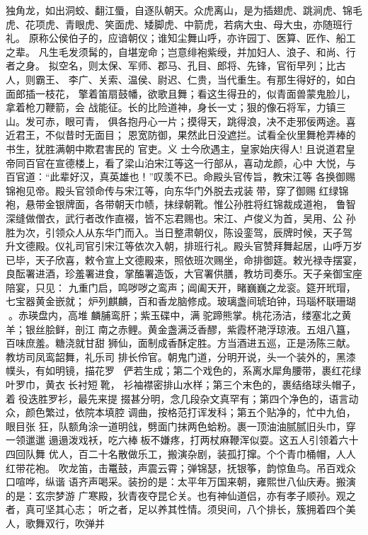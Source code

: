 独角龙，如出洞蛟、翻江蜃，自逐队朝天。众虎离山，是为插翅虎、跳涧虎、锦毛
虎、花项虎、青眼虎、笑面虎、矮脚虎、中箭虎，若病大虫、母大虫，亦随班行礼。
原称公侯伯子的，应谙朝仪；谁知尘舞山呼，亦许园丁、医算、匠作、船工之辈。
凡生毛发须髯的，自堪宠命；岂意绯袍紫绶，并加妇人、浪子、和尚、行者之身。
拟空名，则太保、军师、郡马、孔目、郎将、先锋，官衔早列；比古人，则霸王、
李广、关索、温侯、尉迟、仁贵，当代重生。有那生得好的，如白面郎插一枝花，
擎着笛扇鼓幡，欲歌且舞；看这生得丑的，似青面兽蒙鬼脸儿，拿着枪刀鞭箭，会
战能征。长的比险道神，身长一丈；狠的像石将军，力镇三山。发可赤，眼可青，
俱各抱丹心一片；摸得天，跳得浪，决不走邪佞两途。喜近君王，不似昔时无面目；
恩宽防御，果然此日没遮拦。试看全伙里舞枪弄棒的书生，犹胜满朝中欺君害民的
官吏。义
士今欣遇主，皇家始庆得人!
且说道君皇帝同百官在宣德楼上，看了梁山泊宋江等这一行部从，喜动龙颜，心中
大悦，与百官道：“此辈好汉，真英雄也！”叹羡不已。命殿头官传旨，教宋江等
各换御赐锦袍见帝。殿头官领命传与宋江等，向东华门外脱去戎装带，穿了御赐
红绿锦袍，悬带金银牌面，各带朝天巾帻，抹绿朝靴。惟公孙胜将红锦裁成道袍，
鲁智深缝做僧衣，武行者改作直裰，皆不忘君赐也。宋江、卢俊义为首，吴用、公
孙胜为次，引领众人从东华门而入。当日整肃朝仪，陈设銮驾，辰牌时候，天子驾
升文德殿。仪礼司官引宋江等依次入朝，排班行礼。殿头官赞拜舞起居，山呼万岁
已毕，天子欣喜，敕令宣上文德殿来，照依班次赐坐，命排御筵。敕光禄寺摆宴，
良酝署进酒，珍羞署进食，掌醢署造饭，大官署供膳，教坊司奏乐。天子亲御宝座
陪宴，只见：
九重门启，鸣哕哕之鸾声；阊阖天开，睹巍巍之龙衮。筵开玳瑁，七宝器黄金嵌就；
炉列麒麟，百和香龙脑修成。玻璃盏间琥珀钟，玛瑙杯联珊瑚。赤瑛盘内，高堆
麟脯鸾肝；紫玉碟中，满驼蹄熊掌。桃花汤洁，缕塞北之黄羊；银丝脍鲜，剖江
南之赤鲤。黄金盏满泛香醪，紫霞杯滟浮琼液。五俎八簋，百味庶羞。糖浇就甘甜
狮仙，面制成香酥定胜。方当酒进五巡，正是汤陈三献。教坊司凤鸾韶舞，礼乐司
排长伶官。朝鬼门道，分明开说，头一个装外的，黑漆幞头，有如明镜，描花罗，
俨若生成；第二个戏色的，系离水犀角腰带，裹红花绿叶罗巾，黄衣长衬短靴，
衫袖襟密排山水样；第三个末色的，裹结络球头帽子，着役迭胜罗衫，最先来提
掇甚分明，念几段杂文真罕有；第四个净色的，语言动众，颜色繁过，依院本填腔
调曲，按格范打诨发科；第五个贴净的，忙中九伯，眼目张
狂，队额角涂一道明戗，劈面门抹两色蛤粉。裹一顶油油腻腻旧头巾，穿一领邋邋
遢遢泼戏袄，吃六棒板不嫌疼，打两杖麻鞭浑似耍。这五人引领着六十四回队舞
优人，百二十名散做乐工，搬演杂剧，装孤打撺。个个青巾桶帽，人人红带花袍。
吹龙笛，击鼍鼓，声震云霄；弹锦瑟，抚银筝，韵惊鱼鸟。吊百戏众口喧哗，纵谐
语齐声喝采。装扮的是：太平年万国来朝，雍熙世八仙庆寿。搬演的是：玄宗梦游
广寒殿，狄青夜夺昆仑关。也有神仙道侣，亦有孝子顺孙。观之者，真可坚其心志；
听之者，足以养其性情。须臾间，八个排长，簇拥着四个美人，歌舞双行，吹弹并
